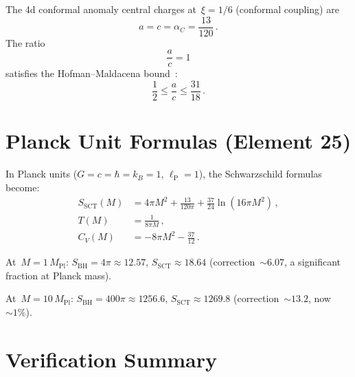 \documentclass[11pt,a4paper]{article}
\newcommand{\lP}{\ell_{\mathrm{P}}}
\newcommand{\alpC}{\alpha_C}
\begin{document}
The 4d conformal anomaly central charges at~$\xi = 1/6$ (conformal
coupling) are
\begin{equation}
  a = c = \alpC = \frac{13}{120}\,.
\end{equation}
The ratio
\begin{equation}
  \frac{a}{c} = 1
\end{equation}
satisfies the Hofman--Maldacena bound~\cite{HM2008}:
\begin{equation}
  \frac{1}{2} \leq \frac{a}{c} \leq \frac{31}{18}\,.
\end{equation}

\section{Planck Unit Formulas (Element 25)}\label{sec:planck}

In Planck units ($G = c = \hbar = k_B = 1$, $\lP = 1$), the
Schwarzschild formulas become:
\begin{align}
  S_{\mathrm{SCT}}(M) &= 4\pi M^2 + \frac{13}{120\pi} + \frac{37}{24}\ln(16\pi M^2)\,, \\
  T(M) &= \frac{1}{8\pi M}\,, \\
  C_V(M) &= -8\pi M^2 - \frac{37}{12}\,.
\end{align}

At~$M = 1\,M_{\mathrm{Pl}}$: $S_{\mathrm{BH}} = 4\pi \approx 12.57$,
$S_{\mathrm{SCT}} \approx 18.64$ (correction~$\sim 6.07$, a significant
fraction at Planck mass).

At~$M = 10\,M_{\mathrm{Pl}}$: $S_{\mathrm{BH}} = 400\pi \approx 1256.6$,
$S_{\mathrm{SCT}} \approx 1269.8$ (correction~$\sim 13.2$, now~$\sim 1\%$).

\section{Verification Summary}\label{sec:summary}
\end{document}
